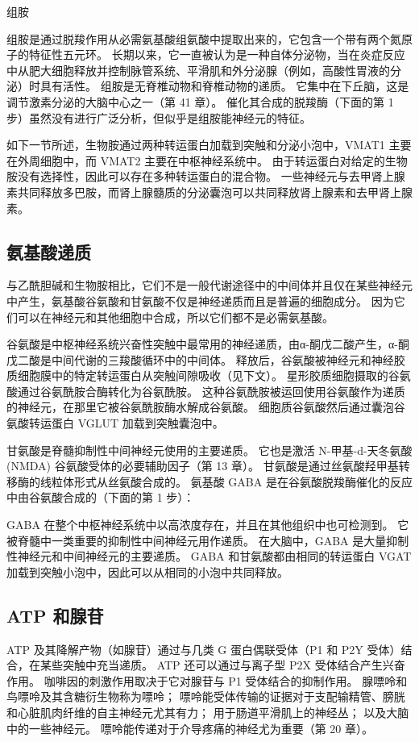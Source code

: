 组胺

组胺是通过脱羧作用从必需氨基酸组氨酸中提取出来的，它包含一个带有两个氮原子的特征性五元环。 长期以来，它一直被认为是一种自体分泌物，当在炎症反应中从肥大细胞释放并控制脉管系统、平滑肌和外分泌腺（例如，高酸性胃液的分泌）时具有活性。 组胺是无脊椎动物和脊椎动物的递质。 它集中在下丘脑，这是调节激素分泌的大脑中心之一（第 41 章）。 催化其合成的脱羧酶（下面的第 1 步）虽然没有进行广泛分析，但似乎是组胺能神经元的特征。

如下一节所述，生物胺通过两种转运蛋白加载到突触和分泌小泡中，VMAT1 主要在外周细胞中，而 VMAT2 主要在中枢神经系统中。 由于转运蛋白对给定的生物胺没有选择性，因此可以存在多种转运蛋白的混合物。 一些神经元与去甲肾上腺素共同释放多巴胺，而肾上腺髓质的分泌囊泡可以共同释放肾上腺素和去甲肾上腺素。




\subsection{氨基酸递质}
与乙酰胆碱和生物胺相比，它们不是一般代谢途径中的中间体并且仅在某些神经元中产生，氨基酸谷氨酸和甘氨酸不仅是神经递质而且是普遍的细胞成分。 因为它们可以在神经元和其他细胞中合成，所以它们都不是必需氨基酸。

谷氨酸是中枢神经系统兴奋性突触中最常用的神经递质，由α-酮戊二酸产生，α-酮戊二酸是中间代谢的三羧酸循环中的中间体。 释放后，谷氨酸被神经元和神经胶质细胞膜中的特定转运蛋白从突触间隙吸收（见下文）。 星形胶质细胞摄取的谷氨酸通过谷氨酰胺合酶转化为谷氨酰胺。 这种谷氨酰胺被运回使用谷氨酸作为递质的神经元，在那里它被谷氨酰胺酶水解成谷氨酸。 细胞质谷氨酸然后通过囊泡谷氨酸转运蛋白 VGLUT 加载到突触囊泡中。

甘氨酸是脊髓抑制性中间神经元使用的主要递质。 它也是激活 N-甲基-d-天冬氨酸 (NMDA) 谷氨酸受体的必要辅助因子（第 13 章）。 甘氨酸是通过丝氨酸羟甲基转移酶的线粒体形式从丝氨酸合成的。 氨基酸 GABA 是在谷氨酸脱羧酶催化的反应中由谷氨酸合成的（下面的第 1 步）：

GABA 在整个中枢神经系统中以高浓度存在，并且在其他组织中也可检测到。 它被脊髓中一类重要的抑制性中间神经元用作递质。 在大脑中，GABA 是大量抑制性神经元和中间神经元的主要递质。 GABA 和甘氨酸都由相同的转运蛋白 VGAT 加载到突触小泡中，因此可以从相同的小泡中共同释放。


\subsection{ATP 和腺苷}

ATP 及其降解产物（如腺苷）通过与几类 G 蛋白偶联受体（P1 和 P2Y 受体）结合，在某些突触中充当递质。 ATP 还可以通过与离子型 P2X 受体结合产生兴奋作用。 咖啡因的刺激作用取决于它对腺苷与 P1 受体结合的抑制作用。 腺嘌呤和鸟嘌呤及其含糖衍生物称为嘌呤； 嘌呤能受体传输的证据对于支配输精管、膀胱和心脏肌肉纤维的自主神经元尤其有力； 用于肠道平滑肌上的神经丛； 以及大脑中的一些神经元。 嘌呤能传递对于介导疼痛的神经尤为重要（第 20 章）。

